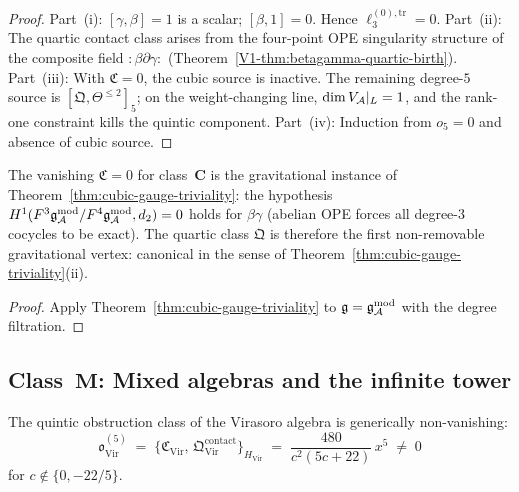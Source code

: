 \begin{proof}
Part~(i): $[\gamma,\beta] = 1$ is a scalar; $[\beta, 1] = 0$.
Hence $\ell_3^{(0),\mathrm{tr}} = 0$.
Part~(ii): The quartic contact class arises from the
four-point OPE singularity structure of the composite field
$:\!\beta\partial\gamma\!:$
(Theorem~\ref{V1-thm:betagamma-quartic-birth}).
Part~(iii): With $\mathfrak{C} = 0$, the cubic source is
inactive. The remaining degree-$5$ source is
$[\mathfrak{Q}, \Theta^{\leq 2}]_5$; on the weight-changing
line, $\dim V_{\mathcal{A}}|_L = 1$, and the rank-one constraint
kills the quintic component.
Part~(iv): Induction from $o_5 = 0$ and absence of cubic
source.
\end{proof}

\begin{proposition}
\ClaimStatusProvedHere
{}
The vanishing $\mathfrak{C} = 0$ for class~$\mathbf{C}$ is
the gravitational instance of
Theorem~\ref{thm:cubic-gauge-triviality}: the hypothesis
$H^1(F^3\mathfrak{g}_{\mathcal{A}}^{\mathrm{mod}}/F^4\mathfrak{g}_{\mathcal{A}}^{\mathrm{mod}}, d_2) = 0$ holds for $\beta\gamma$
\textup{(}abelian OPE forces all degree-$3$ cocycles to be
exact\textup{)}. The quartic class $\mathfrak{Q}$ is therefore
the first non-removable gravitational vertex: canonical in the
sense of Theorem~\ref{thm:cubic-gauge-triviality}(ii).
\end{proposition}

\begin{proof}
Apply Theorem~\ref{thm:cubic-gauge-triviality} to
$\mathfrak{g} = \mathfrak{g}_{\mathcal{A}}^{\mathrm{mod}}$ with the degree filtration.
\end{proof}



\subsection{Class~$\mathbf{M}$: Mixed algebras and the infinite tower}

\begin{theorem}
\label{thm:thqg-virasoro-quintic}
\ClaimStatusProvedHere
{}
The quintic obstruction class of the Virasoro algebra is
generically non-vanishing:
\begin{equation}%
\mathfrak{o}^{(5)}_{\mathrm{Vir}}
\;=\;
\{\mathfrak{C}_{\mathrm{Vir}},\,
\mathfrak{Q}^{\mathrm{contact}}_{\mathrm{Vir}}\}_{H_{\mathrm{Vir}}}
\;=\;
\frac{480}{c^2(5c+22)}\,x^5
\;\neq\; 0
\end{equation}
for $c \notin \{0, -22/5\}$.
\end{theorem}

